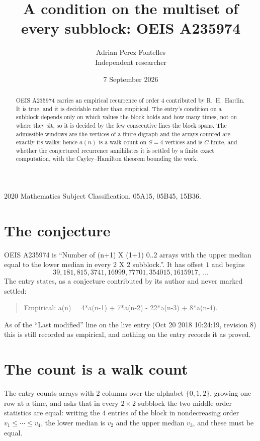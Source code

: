 \documentclass[11pt,a4paper]{article}
\title{A condition on the multiset of every subblock: OEIS A235974}
\author{Adrian Perez Fontelles\\ \small Independent researcher}
\date{7 September 2026}
\theoremstyle{plain}
\theoremstyle{definition}
\begin{document}
\maketitle

\begin{abstract}
OEIS A235974 carries an empirical recurrence of order $4$ contributed by R.~H.~Hardin. It is
true, and it is decidable rather than empirical. The entry's condition on a subblock depends
only on which values the block holds and how many times, not on where they sit, so it is
decided by the few consecutive lines the block spans. The admissible windows are the vertices
of a finite digraph and the arrays counted are exactly its walks; hence $a(n)$ is a walk count
on $S=4$ vertices and is $C$-finite, and whether the conjectured recurrence annihilates it
is settled by a finite exact computation, with the Cayley--Hamilton theorem bounding the
work.
\end{abstract}

\noindent\small 2020 Mathematics Subject Classification. 05A15, 05B45, 15B36.\normalsize

\section{The conjecture}

OEIS A235974 is ``Number of (n+1) X (1+1) 0..2 arrays with the upper median equal to the lower median in every 2 X 2 subblock.''. It has offset $1$ and begins
\[
39, 181, 815, 3741, 16999, 77701, 354015, 1615917,\ \dots
\]
The entry states, as a conjecture contributed by its author and never marked settled:
\begin{quote}
Empirical: a(n) = 4*a(n-1) + 7*a(n-2) - 22*a(n-3) + 8*a(n-4).
\end{quote}
As of the ``Last modified'' line on the live entry (Oct 20 2018 10:24:19, revision 8) this is still
recorded as empirical, and nothing on the entry records it as proved.

\section{The count is a walk count}

The entry counts arrays with $2$ columns over the alphabet $\{0,1,2\}$, growing one row at a time, and asks that in every $2\times2$ subblock the two middle order statistics are equal: writing the $4$ entries of the block in nondecreasing order $v_1\le\cdots\le v_{4}$, the lower median is $v_{2}$ and the upper median $v_{3}$, and these must be equal.
\end{document}
